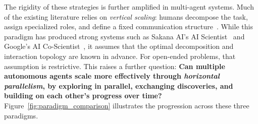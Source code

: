 The rigidity of these strategies is further amplified in multi-agent systems. Much of the existing literature relies on \emph{vertical scaling}: humans decompose the task, assign specialized roles, and define a fixed communication structure~\citep{hong2024metagpt,li2023camel,wu2024autogen}. While this paradigm has produced strong systems such as Sakana AI's AI Scientist~\citep{lu2024aiscientist} and Google's AI Co-Scientist~\citep{gottweis2025towards}, it assumes that the optimal decomposition and interaction topology are known in advance. For open-ended problems, that assumption is restrictive. This raises a further question: \textbf{Can multiple autonomous agents scale more effectively through \emph{horizontal parallelism}, by exploring in parallel, exchanging discoveries, and building on each other's progress over time?} Figure~\ref{fig:paradigm_comparison} illustrates the progression across these three paradigms.


